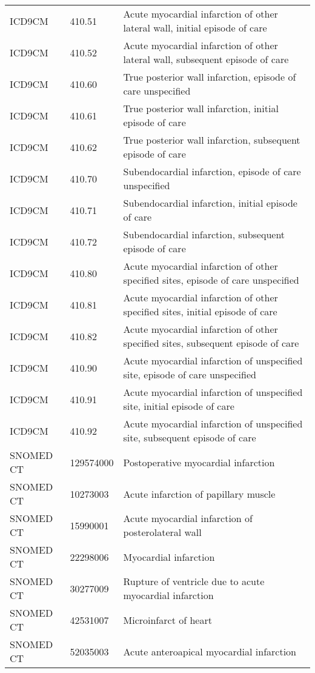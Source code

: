 \begin{longtable}{p{}p{}p{}}
  ICD9CM & 410.51 & Acute myocardial infarction of other lateral wall, initial episode of care \\ 
  ICD9CM & 410.52 & Acute myocardial infarction of other lateral wall, subsequent episode of care \\ 
  ICD9CM & 410.60 & True posterior wall infarction, episode of care unspecified \\ 
  ICD9CM & 410.61 & True posterior wall infarction, initial episode of care \\ 
  ICD9CM & 410.62 & True posterior wall infarction, subsequent episode of care \\ 
  ICD9CM & 410.70 & Subendocardial infarction, episode of care unspecified \\ 
  ICD9CM & 410.71 & Subendocardial infarction, initial episode of care \\ 
  ICD9CM & 410.72 & Subendocardial infarction, subsequent episode of care \\ 
  ICD9CM & 410.80 & Acute myocardial infarction of other specified sites, episode of care unspecified \\ 
  ICD9CM & 410.81 & Acute myocardial infarction of other specified sites, initial episode of care \\ 
  ICD9CM & 410.82 & Acute myocardial infarction of other specified sites, subsequent episode of care \\ 
  ICD9CM & 410.90 & Acute myocardial infarction of unspecified site, episode of care unspecified \\ 
  ICD9CM & 410.91 & Acute myocardial infarction of unspecified site, initial episode of care \\ 
  ICD9CM & 410.92 & Acute myocardial infarction of unspecified site, subsequent episode of care \\ 
  SNOMED CT & 129574000 & Postoperative myocardial infarction \\ 
  SNOMED CT & 10273003 & Acute infarction of papillary muscle \\ 
  SNOMED CT & 15990001 & Acute myocardial infarction of posterolateral wall \\ 
  SNOMED CT & 22298006 & Myocardial infarction \\ 
  SNOMED CT & 30277009 & Rupture of ventricle due to acute myocardial infarction \\ 
  SNOMED CT & 42531007 & Microinfarct of heart \\ 
  SNOMED CT & 52035003 & Acute anteroapical myocardial infarction \\ 

\end{longtable}
